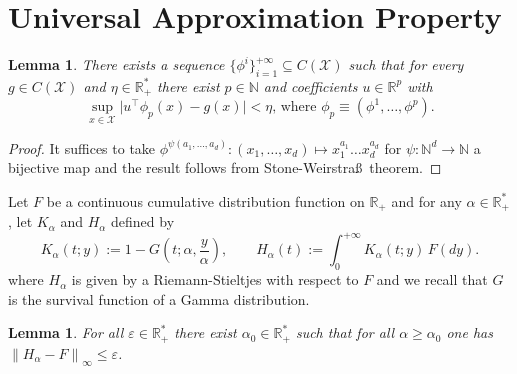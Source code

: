 \documentclass{article}
\newtheorem{lemma}[theorem]{Lemma}
\newcommand{\norm}[1]{\left\lVert#1\right\rVert}
\newcommand{\R}{\mathbb{R}}
\begin{document}
\section{Universal Approximation Property}\label{proof:univ_approx}

\begin{lemma} \label{lem:universal-phi}
There exists a sequence $\{\phi^i\}_{i=1}^{+\infty} \subseteq C(\mathcal X)$ such that
for every $g\in C(\mathcal X)$ and $\eta \in \R_{+}^*$ there exist $p \in \mathbb{N}$ and coefficients $u\in\R^p$ with
\[ \sup_{x\in\mathcal X}\big|u^\top \phi_p(x)-g(x)\big|<\eta \text{, where }\phi_p\equiv(\phi^1,\ldots,\phi^p).\]
\end{lemma}
\begin{proof}
It suffices to take $\phi^{\psi(a_1,\ldots,a_d)} : (x_1,\ldots,x_d) \mapsto x_1^{a_1}\ldots x_d^{a_d}$ for $\psi : \mathbb{N}^d \to \mathbb{N}$ a bijective map and the result follows from Stone-Weirstra\ss\ theorem.
\end{proof}

Let $F$ be a continuous cumulative distribution function on $\R_{+}$ and for any $\alpha \in \R_{+}^*$, let $K_\alpha$ and $H_\alpha$ defined by
\[
  K_\alpha(t;y):=1-G\!\left(t;\alpha,\frac{y}{\alpha}\right),\qquad
  H_\alpha(t):=\int_{0}^{+\infty} K_\alpha(t;y)\,F(dy).
\]
where $H_\alpha$ is given by a Riemann-Stieltjes with respect to $F$ and we recall that $G$ is the survival function of a Gamma distribution.

\begin{lemma}\label{lem:fixedshape-kernel}
For all $\varepsilon \in \R_{+}^*$ there exist $\alpha_0 \in \R_{+}^*$ such that for all $\alpha \geq \alpha_0$ one has  $\norm{H_\alpha-F}_\infty \leq \varepsilon$.
\end{lemma}
\end{document}
